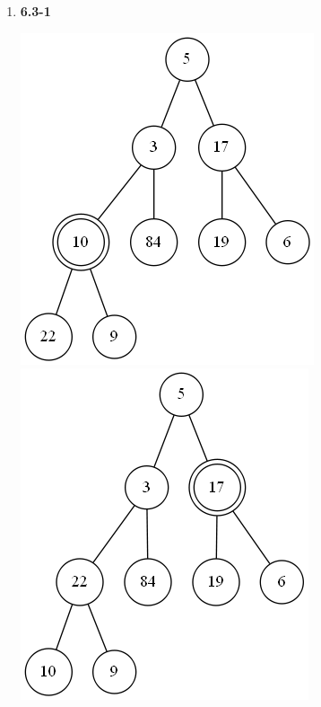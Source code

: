\documentclass[a4paper]{article}
\begin{document}
\begin{enumerate}
        \item 
        \textbf{6.3-1} \\
        \begin{center}
            \includegraphics[scale=0.3]{63-1a} \phantom{hello}
            \includegraphics[scale=0.3]{63-1b} 
        \end{center}


\end{enumerate}
\end{document}
